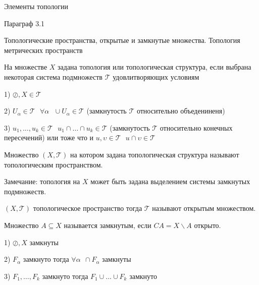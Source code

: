 \begin{title}
  Элементы топологии
\end{title}

\begin{title}[\Large]
  Параграф 3.1
\end{title}

\begin{title}[\Large]
  Топологические пространства, открытые и замкнутые множества. Топология
  метрических пространств
\end{title}

\begin{define}
  На множестве $X$ задана топология или топологическая структура, если
  выбрана некоторая система подмножеств $\mathcal{T}$ удовлитворяющих условиям

  1) $\oslash, X \in \mathcal{T}$

  2) $U_{\alpha} \in \mathcal{T} ~~~ \forall \alpha ~~~ \cup U_{\alpha} \in
  \mathcal{T}$ (замкнутость $\mathcal{T}$ относительно объедениненя)

  3) $u_1, \ldots, u_k \in \mathcal{T} ~~~ u_1 \cap \ldots \cap u_k \in
  \mathcal{T}$ (замкнутость $\mathcal{T}$ относительно конечных пересечений)
  или тоже что и $u, \upsilon \in \mathcal{T} ~~~ u \cap \upsilon \in
  \mathcal{T}$
\end{define}

\begin{define}
  Множество $(X, \mathcal{T})$ на котором задана топологическая структура
  называют топологическим пространством.

  Замечание: топология на $X$ может быть задана выделением системы замкнутых
  подмножеств.
\end{define}

\begin{define}
  $(X, \mathcal{T})$ топологическое пространство тогда
  $\mathcal{T}$ называют открытым множеством.
\end{define}

\begin{define}
  Множество $A \subseteq X$ называется замкнутым, если
  $CA = X \backslash A$ открыто.
\end{define}

\begin{block}
  1) $\oslash, X$ замкнуты

  2) $F_{\alpha}$ замкнуто тогда $\forall \alpha ~~ \cap F_{\alpha}$ замкнуты

  3) $F_1, \ldots, F_k$ замкнуто тогда $F_1 \cup \ldots \cup F_k$ замкнуто
\end{block}

